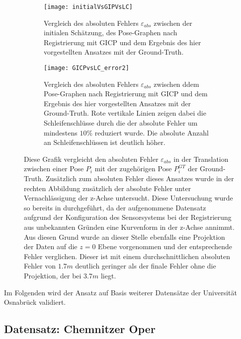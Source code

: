 \begin{figure}
	\centering
	\begin{subfigure}{.5\textwidth}
		 \centering
  		 \texttt{[image: initialVsGIPVsLC]}
  		 \centering \caption{Vergleich des absoluten Fehlers $\varepsilon_{abs}$ zwischen der initialen Schätzung, des Pose-Graphen nach Registrierung mit GICP und dem Ergebnis des hier vorgestellten Ansatzes mit der Ground-Truth.}
  		 \label{fig:initialVsGIPVsLC}
	\end{subfigure}%
	\begin{subfigure}{.5\textwidth}
    	\centering
  		\texttt{[image: GICPvsLC\_error2]}
  		\centering \caption{Vergleich des absoluten Fehlers $\varepsilon_{abs}$ zwischen ddem Pose-Graphen nach Registrierung mit GICP und dem Ergebnis des hier vorgestellten Ansatzes mit der Ground-Truth. Rote vertikale Linien zeigen dabei die Schleifenschlüsse durch die der absolute Fehler um mindestens $10\%$ reduziert wurde. Die absolute Anzahl an Schleifenschlüssen ist deutlich höher.}
  		\label{fig:GICPvsLC_error2}
	\end{subfigure}
	\caption{Diese Grafik vergleicht den absoluten Fehler $\varepsilon_{abs}$ in der Translation zwischen einer Pose $P_i$ mit der zugehörigen Pose $P_i^{GT}$ der Ground-Truth. Zusätzlich zum absoluten Fehler dieses Ansatzes wurde in der rechten Abbildung zusätzlich der absolute Fehler unter Vernachlässigung der z-Achse untersucht. Diese Untersuchung wurde so bereits in \cite{sprickerhof2011heuristic} durchgeführt, da der aufgenommene Datensatz aufgrund der Konfiguration des Sensorsystems bei der Registrierung aus unbekannten Gründen eine Kurvenform in der z-Achse annimmt. Aus diesen Grund wurde an dieser Stelle ebenfalls eine Projektion der Daten auf die $z=0$ Ebene vorgenommen und der entsprechende Fehler verglichen. Dieser ist mit einem durchschnittlichen absoluten Fehler von $1.7m$ deutlich geringer als der finale Fehler ohne die Projektion, der bei $3.7m$ liegt.}
	\label{fig:Han1Error}
\end{figure}

Im Folgenden wird der Ansatz auf Basis weiterer Datensätze der Universität Osnabrück validiert.

\subsection{Datensatz: Chemnitzer Oper}

